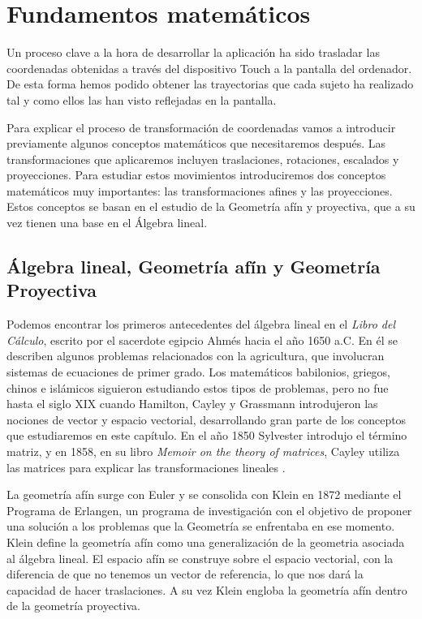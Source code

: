 \documentclass[a4paper,11pt, oneside]{book}
\begin{document}
\chapter{Fundamentos matemáticos}

Un proceso clave a la hora de desarrollar la aplicación ha sido trasladar las coordenadas obtenidas a través del dispositivo Touch a la pantalla del ordenador. De esta forma hemos podido obtener las trayectorias que cada sujeto ha realizado tal y como ellos las han visto reflejadas en la pantalla. 

Para explicar el proceso de transformación de coordenadas vamos a introducir previamente algunos conceptos matemáticos que necesitaremos después. Las transformaciones que aplicaremos incluyen traslaciones, rotaciones, escalados y proyecciones. Para estudiar estos movimientos introduciremos dos conceptos matemáticos muy importantes: las transformaciones afines y las proyecciones. Estos conceptos se basan en el estudio de la Geometría afín y proyectiva, que a su vez tienen una base en el Álgebra lineal. 


\section{Álgebra lineal, Geometría afín y Geometría Proyectiva}
Podemos encontrar los primeros antecedentes del álgebra lineal en el \textit{Libro del Cálculo}, escrito por el sacerdote egipcio Ahmés hacia el año 1650 a.C. En él se describen algunos problemas relacionados con la agricultura, que involucran sistemas de ecuaciones de primer grado. Los matemáticos babilonios, griegos, chinos e islámicos siguieron estudiando estos tipos de problemas, pero no fue hasta el siglo  XIX cuando Hamilton, Cayley y Grassmann introdujeron las nociones de vector y espacio vectorial, desarrollando gran parte de los conceptos que estudiaremos en este capítulo. En el año 1850 Sylvester introdujo el término matriz, y en 1858, en su libro \textit{Memoir on the theory of matrices}, Cayley utiliza las matrices para explicar las transformaciones lineales \cite{historia}.

La geometría afín surge con Euler y se consolida con Klein en 1872 mediante el Programa de Erlangen, un programa de investigación con el objetivo de proponer una solución a los problemas que la Geometría se enfrentaba en ese momento. Klein define la geometría afín como una generalización de la geometria asociada al álgebra lineal. El espacio afín se construye sobre el espacio vectorial, con la diferencia de que no tenemos un vector de referencia, lo que nos dará la capacidad de hacer traslaciones. A su vez Klein engloba la geometría afín dentro de la geometría proyectiva.
\end{document}
